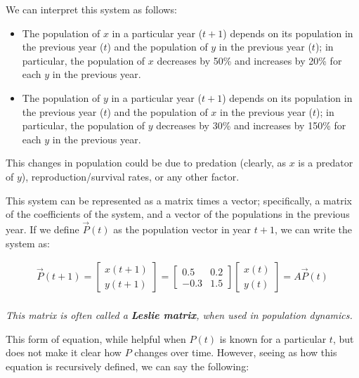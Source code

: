 \documentclass[12pt]{article}
\begin{document}
{{We can interpret this system as follows:

\begin{itemize}
    \item The population of $x$ in a particular year ($t+1$) depends on its population in the previous year ($t$) and the population of $y$ in the previous year ($t$); in particular, the population of $x$ decreases by 50\% and increases by 20\% for each $y$ in the previous year.
    \item The population of $y$ in a particular year ($t+1$) depends on its population in the previous year ($t$) and the population of $x$ in the previous year ($t$); in particular, the population of $y$ decreases by 30\% and increases by 150\% for each $y$ in the previous year.
\end{itemize}

This changes in population could be due to predation (clearly, as $x$ is a predator of $y$), reproduction/survival rates, or any other factor.

This system can be represented as a matrix times a vector; specifically, a matrix of the coefficients of the system, and a vector of the populations in the previous year. If we define $\vec{P}(t)$ as the population vector in year $t+1$, we can write the system as:

\begin{equation}
    \begin{split}
        \vec{P}(t+1) = \begin{bmatrix}
            x(t+1)\\
            y(t+1)
        \end{bmatrix} = \begin{bmatrix}
            0.5 & 0.2\\
            -0.3 & 1.5
        \end{bmatrix}\begin{bmatrix}
            x(t)\\
            y(t)
        \end{bmatrix} = A\vec{P}(t)\\
    \end{split}
\end{equation}

\textit{This matrix is often called a \textbf{Leslie matrix}, when used in population dynamics.}

This form of equation, while helpful when $P(t)$ is known for a particular $t$, but does not make it clear how $P$ changes over time. However, seeing as how this equation is recursively defined, we can say the following: 

}}
\end{document}
